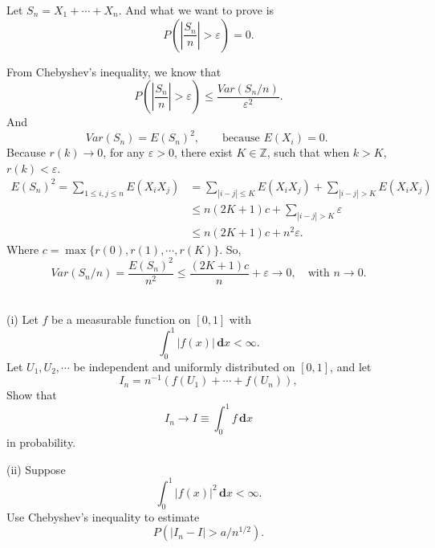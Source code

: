\documentclass[en, normal, 11pt, black]{elegantnote}
\newenvironment{exercise}[1]{\begin{tcolorbox}[colback=black!15, colframe=black!80, breakable, title=#1]}{\end{tcolorbox}}
\renewenvironment{proof}{\begin{tcolorbox}[colback=white, colframe=black!50, breakable, title=Proof. ]\setlength{\parskip}{0.8em}}{\,\\\rightline{$\square$}\end{tcolorbox}}
\newcommand{\der}{\,\mathbf{d}}
\begin{document}
    \begin{proof}
        Let $S_n=X_1+\cdots+X_n$. And what we want to prove is 
        \[
            P\left(\left|\frac{S_n}{n}\right|>\varepsilon\right)=0. 
        \]

        From Chebyshev's inequality, we know that 
        \[
            P\left(\left|\frac{S_n}{n}\right|>\varepsilon\right)\leqslant\frac{Var(S_n/n)}{\varepsilon^2}. 
        \]
        And
        \[
            Var(S_n)=E(S_n)^2, \qquad\text{because $E(X_i)=0$. }
        \]
        Because $r(k)\to0$, for any $\varepsilon>0$, there exist $K\in\mathbb{Z}$, such that when $k>K$, $r(k)<\varepsilon$. 
        \[
            \begin{aligned}
                E(S_n)^2=\sum_{1\leqslant i,j\leqslant n}E(X_iX_j)&=\sum_{|i-j|\leqslant K}E(X_iX_j)+\sum_{|i-j|>K}E(X_iX_j)\\
                &\leqslant n(2K+1)c+\sum_{|i-j|>K}\varepsilon\\
                &\leqslant n(2K+1)c+n^2\varepsilon. 
            \end{aligned}
        \]
        Where $c=\max\{r(0), r(1), \cdots, r(K)\}$. 
        So, 
        \[
            Var(S_n/n)=\frac{E(S_n)^2}{n^2}\leqslant\frac{(2K+1)c}{n}+\varepsilon\to0,\quad\text{with $n\to0$}. 
        \]
        \vspace*{-30pt}
    \end{proof}

    \begin{exercise}{2.2.3. Monte Carlo integration. }
        (i) Let $f$ be a measurable function on $[0,1]$ with 
        \[
            \int_{0}^{1}|f(x)| \der x<\infty. 
        \]
        Let $U_{1}, U_{2}, \cdots$ be independent and uniformly distributed on $[0,1]$, and let
        \[
            I_{n}=n^{-1}\left(f\left(U_{1}\right)+\cdots+f\left(U_{n}\right)\right), 
        \]
        Show that 
        \[
            I_{n} \rightarrow I \equiv \int_{0}^{1} f \der x
        \]
        in probability. 
        
        (ii) Suppose 
        \[
            \int_{0}^{1}|f(x)|^{2} \der x<\infty. 
        \]
        Use Chebyshev's inequality to estimate 
        \[
            P\left(\left|I_{n}-I\right|>a / n^{1 / 2}\right). 
        \]
    \end{exercise}
\end{document}

